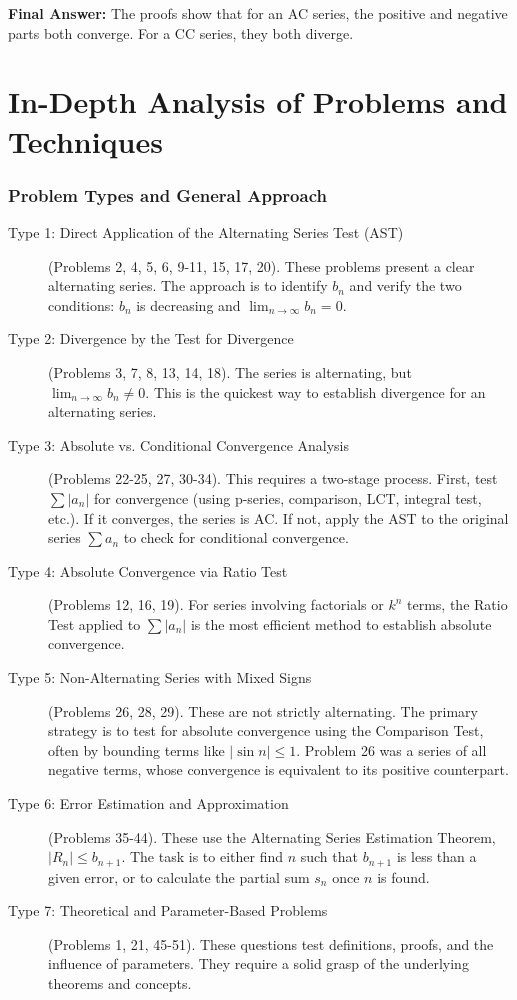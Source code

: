 \documentclass{article}
\begin{document}
\textbf{Final Answer:} The proofs show that for an AC series, the positive and negative parts both converge. For a CC series, they both diverge.

\part{In-Depth Analysis of Problems and Techniques}

\section{Problem Types and General Approach}
\begin{description}
    \item[Type 1: Direct Application of the Alternating Series Test (AST)] (Problems 2, 4, 5, 6, 9-11, 15, 17, 20). These problems present a clear alternating series. The approach is to identify $b_n$ and verify the two conditions: $b_n$ is decreasing and $\lim_{n \to \infty} b_n = 0$.
    
    \item[Type 2: Divergence by the Test for Divergence] (Problems 3, 7, 8, 13, 14, 18). The series is alternating, but $\lim_{n \to \infty} b_n \neq 0$. This is the quickest way to establish divergence for an alternating series.
    
    \item[Type 3: Absolute vs. Conditional Convergence Analysis] (Problems 22-25, 27, 30-34). This requires a two-stage process. First, test $\sum |a_n|$ for convergence (using p-series, comparison, LCT, integral test, etc.). If it converges, the series is AC. If not, apply the AST to the original series $\sum a_n$ to check for conditional convergence.
    
    \item[Type 4: Absolute Convergence via Ratio Test] (Problems 12, 16, 19). For series involving factorials or $k^n$ terms, the Ratio Test applied to $\sum|a_n|$ is the most efficient method to establish absolute convergence.
    
    \item[Type 5: Non-Alternating Series with Mixed Signs] (Problems 26, 28, 29). These are not strictly alternating. The primary strategy is to test for absolute convergence using the Comparison Test, often by bounding terms like $|\sin n| \le 1$. Problem 26 was a series of all negative terms, whose convergence is equivalent to its positive counterpart.
        
    \item[Type 6: Error Estimation and Approximation] (Problems 35-44). These use the Alternating Series Estimation Theorem, $|R_n| \le b_{n+1}$. The task is to either find $n$ such that $b_{n+1}$ is less than a given error, or to calculate the partial sum $s_n$ once $n$ is found.
    
    \item[Type 7: Theoretical and Parameter-Based Problems] (Problems 1, 21, 45-51). These questions test definitions, proofs, and the influence of parameters. They require a solid grasp of the underlying theorems and concepts.
\end{description}
\end{document}
